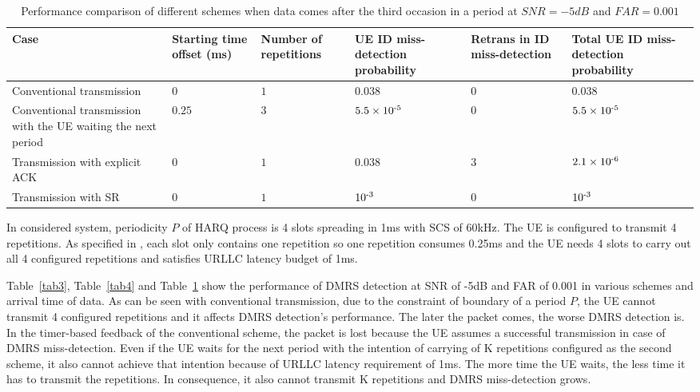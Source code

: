 \documentclass[conference]{IEEEtran}
\begin{document}
\begin{table}[htbp]
\caption{Performance comparison of different schemes when data comes after the third occasion in a period at $SNR = -5dB$ and $FAR = 0.001$}
\begin{center}
\begin{tabular}{|p{6em}|p{3em}|p{3em}|p{3.2em}|p{3.2em}|p{3.2em}|}
 \hline
 \textbf{Case} & \textbf{Starting time offset (ms)}&\textbf{Number of repetitions}&\textbf{UE ID miss-detection probability}&\textbf{Retrans in ID miss-detection}&\textbf{Total UE ID miss-detection probability}\\
 \hline
 Conventional transmission&$0$&$1$&$0.038$&$0$&$0.038$\\
 \hline
  Conventional transmission with the UE waiting the next period&$0.25$&$3$&$5.5\times10\textsuperscript{-5}$&$0$&$5.5\times10\textsuperscript{-5}$\\
 \hline
Transmission with explicit ACK&$0$&$1$&$0.038$&$3$&$2.1\times10\textsuperscript{-6}$\\
\hline
Transmission with SR&$0$&$1$&$10\textsuperscript{-3}$&$0$&$10\textsuperscript{-3}$\\
 \hline
\end{tabular}
\label{tab5}
\end{center}
\vspace{-7mm}
\end{table}

In considered system, periodicity $P$ of HARQ process is 4 slots spreading in 1ms with SCS of 60kHz. The UE is configured to transmit 4 repetitions. As specified in \cite{ad2}, each slot only contains one repetition so one repetition consumes 0.25ms and the UE needs 4 slots to carry out all 4 configured repetitions and satisfies URLLC latency budget of 1ms.

Table~\ref{tab3}, Table~\ref{tab4} and Table~\ref{tab5} show the performance of DMRS detection at SNR of -5dB and FAR of 0.001 in various schemes and arrival time of data. As can be seen with conventional  transmission, due to the constraint of boundary of a period $P$, the UE cannot transmit 4 configured repetitions and it affects DMRS detection's performance. The later the packet comes, the worse DMRS detection is. In the timer-based feedback of the conventional scheme, the packet is lost because the UE assumes a successful transmission in case of DMRS miss-detection. Even if the UE waits for the next period with the intention of carrying of K repetitions configured as the second scheme, it also cannot achieve that intention because of URLLC latency requirement of 1ms. The more time the UE waits, the less time it has to transmit the repetitions. In consequence, it also cannot transmit K repetitions and DMRS miss-detection grows.
\end{document}
